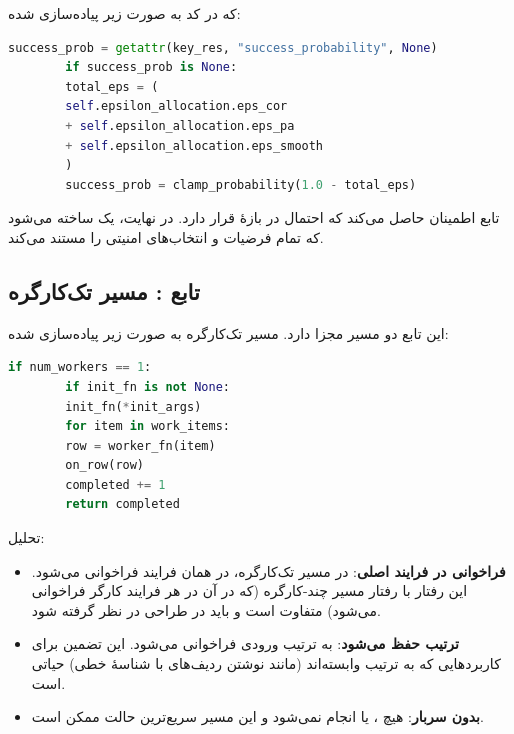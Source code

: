 \noindent که در کد به صورت زیر پیاده‌سازی شده:

\begin{LTR}
	\begin{lstlisting}[language=Python]
		success_prob = getattr(key_res, "success_probability", None)
		if success_prob is None:
		total_eps = (
		self.epsilon_allocation.eps_cor
		+ self.epsilon_allocation.eps_pa
		+ self.epsilon_allocation.eps_smooth
		)
		success_prob = clamp_probability(1.0 - total_eps)
	\end{lstlisting}
\end{LTR}

\noindent تابع  اطمینان حاصل می‌کند که احتمال در بازۀ \lr{$[0, 1]$} قرار دارد. در نهایت، یک  ساخته می‌شود که تمام فرضیات و انتخاب‌های امنیتی را مستند می‌کند.

\subsection{تابع : مسیر تک‌کارگره}

این تابع دو مسیر مجزا دارد. مسیر تک‌کارگره به صورت زیر پیاده‌سازی شده:

\begin{LTR}
	\begin{lstlisting}[language=Python]
		if num_workers == 1:
		if init_fn is not None:
		init_fn(*init_args)
		for item in work_items:
		row = worker_fn(item)
		on_row(row)
		completed += 1
		return completed
	\end{lstlisting}
\end{LTR}

\noindent تحلیل:

\begin{itemize}
	\item \textbf{فراخوانی  در فرایند اصلی}: در مسیر تک‌کارگره،  در همان فرایند فراخوانی می‌شود. این رفتار با رفتار مسیر چند-کارگره (که در آن  در هر فرایند کارگر فراخوانی می‌شود) متفاوت است و باید در طراحی  در نظر گرفته شود.
	\item \textbf{ترتیب حفظ می‌شود}:  به ترتیب ورودی فراخوانی می‌شود. این تضمین برای کاربردهایی که به ترتیب وابسته‌اند (مانند نوشتن ردیف‌های  با شناسۀ خطی) حیاتی است.
	\item \textbf{بدون سربار}: هیچ ،  یا  انجام نمی‌شود و این مسیر سریع‌ترین حالت ممکن است.
\end{itemize}

